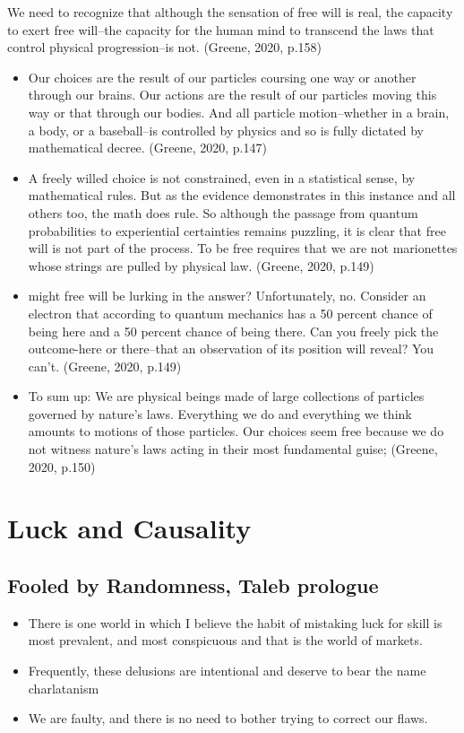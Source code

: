 \documentclass[11pt]{article}
\begin{document}
We need to recognize that although the sensation of free will is real, the capacity to exert free will--the capacity for the human mind to transcend the laws that control physical progression--is not.
(Greene, 2020, p.158)
\begin{itemize}
 \item {Our choices are the result of our particles coursing one way or another through our brains. Our actions are the result of our particles moving this way or that through our bodies. And all particle motion--whether in a brain, a body, or a baseball--is controlled by physics and so is fully dictated by mathematical decree. (Greene, 2020, p.147)
       }
       \item{
                   A freely willed choice is not constrained, even in a statistical sense, by mathematical rules. But as the evidence demonstrates in this instance and all others too, the math does rule. So although the passage from quantum probabilities to experiential certainties remains puzzling, it is clear that free will is not part of the process. To be free requires that we are not marionettes whose strings are pulled by physical law. (Greene, 2020, p.149)
             }
       \item{
                   might free will be lurking in the answer? Unfortunately, no. Consider an electron that according to quantum mechanics has a 50 percent chance of being here and a 50 percent chance of being there. Can you freely pick the outcome-here or there--that an observation of its position will reveal? You can't.
                   (Greene, 2020, p.149)
             }
 \item {
       To sum up: We are physical beings made of large collections of particles governed by nature's laws. Everything we do and everything we think amounts to motions of those particles.
       Our choices seem free because we do not witness nature's laws acting in their most fundamental guise;
       (Greene, 2020, p.150)
       }
\end{itemize}
\section{Luck and Causality}
\subsection{
 Fooled by Randomness, Taleb prologue
}
\begin{itemize}
 \item {
       There is one world in which I believe the habit of mistaking luck for skill is most prevalent, and most conspicuous and that is the world of markets.
       }
 \item {Frequently, these delusions are intentional and deserve to bear the name charlatanism}
 \item {
       We are faulty, and there is no need to bother trying to correct our flaws.
       }
\end{itemize}
\end{document}
